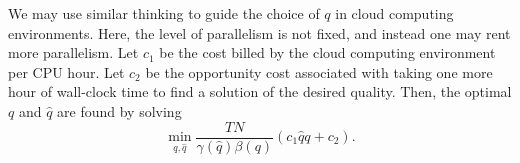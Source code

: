 \documentclass[paper=letter]{scrartcl}
\begin{document}




We may use similar thinking to guide the choice of $q$ in cloud computing environments.  Here, the level of parallelism is not fixed, and instead one may rent more parallelism.  Let $c_1$ be the cost billed by the cloud computing environment per CPU hour. Let $c_2$ be the opportunity cost associated with taking one more hour of wall-clock time to find a solution of the desired quality. 
Then, the optimal $q$ and $\hat{q}$ are found by solving
\begin{equation*}
\min_{q, \hat{q}} \frac{TN}{\gamma(\hat{q}) \beta(q)} \left( c_1 \hat{q} q + c_2 \right).
\end{equation*}
\end{document}
